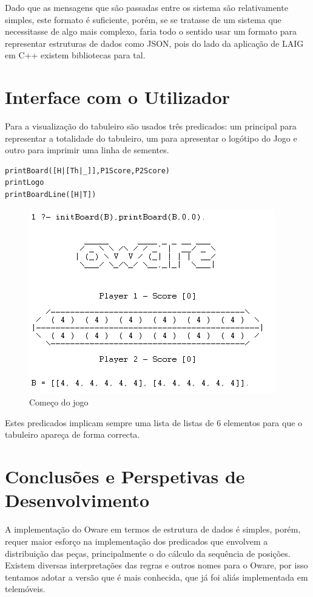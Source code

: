 \documentclass[15pt,a4paper]{article}
\begin{document}
Dado que as mensagens que são passadas entre os sistema são relativamente simples, este formato é suficiente, porém, se se tratasse de um sistema que necessitasse de algo mais complexo, faria todo o sentido usar um formato para representar estruturas de dados como JSON, pois do lado da aplicação de LAIG em C++ existem bibliotecas para tal.


\section{Interface com o Utilizador}
Para a visualização do tabuleiro são usados três predicados: um principal para representar a totalidade do tabuleiro, um para apresentar o logótipo do Jogo e outro para imprimir uma linha de sementes.

 \begin{verbatim}
printBoard([H|[Th|_]],P1Score,P2Score)
printLogo
printBoardLine([H|T])
\end{verbatim}

\begin{figure}[h!]
	\begin{center}
	\includegraphics[scale=1]{printBoardExample.png}
	\caption{Começo do jogo}
	\label{fig:Comeco}
	\end{center}
\end{figure}

Estes predicados implicam sempre uma lista de listas de 6 elementos para que o tabuleiro apareça de forma correcta.
\newpage
\section{Conclusões e Perspetivas de Desenvolvimento}
\indent A implementação do Oware em termos de estrutura de dados é simples, porém, 
requer maior esforço na implementação dos predicados que envolvem a distribuição das peças, principalmente o do cálculo da sequência de posições. Existem diversas interpretações das regras e outros nomes para o Oware, por isso tentamos adotar a versão que é mais conhecida, que já foi aliás implementada em telemóveis.\\
\end{document}
